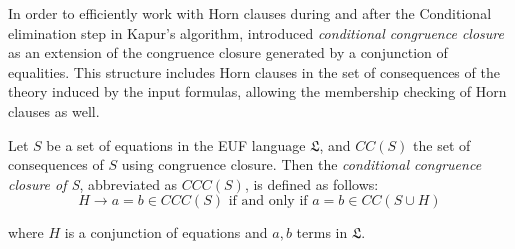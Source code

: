 In order to efficiently work with Horn clauses 
during and after the Conditional elimination step
in Kapur's algorithm, \cite{KAPUR2019} introduced 
\emph{conditional congruence closure} as 
an extension of the congruence closure
generated by a conjunction of equalities.
This structure includes Horn clauses in the set
of consequences of the theory induced by
the input formulas, allowing the membership checking 
of Horn clauses as well. 

\begin{definition}
  Let $S$ be a set of equations in the EUF language
  $\mathfrak{L}$, and
  $CC(S)$ the set of consequences of $S$ using congruence
  closure. Then the \emph{conditional congruence closure of S},
  abbreviated as $CCC(S)$,
  is defined as follows:
  \begin{equation*}
    H \rightarrow a = b \in CCC(S) \text{ if and only if } 
    a = b \in CC(S \cup H)
  \end{equation*}

  where $H$ is a conjunction of equations and $a,b$ terms in 
  $\mathfrak{L}$.
\end{definition}

